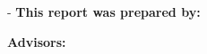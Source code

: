 \begin{titlingpage}
\begin{adjustwidth*}{\unitlength}{-\unitlength}
  \noindent\textbf{This report was prepared by:}\\
  \ThAuthors
  

  \noindent\textbf{Advisors:}\\
  \ThSupervisors
  

  \noindent\ThDepartment
  
  
  \noindent\ThElektroEmail
  
  

 \end{adjustwidth*}
\end{titlingpage}